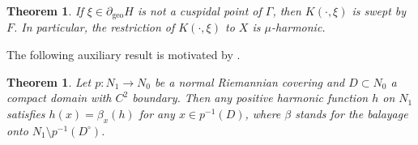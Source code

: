 \documentclass[12pt,a4paper]{amsart}
\numberwithin{equation}{section}
\newtheorem{thm}[equation]{Theorem}
\theoremstyle{definition}
\DeclareMathOperator{\geo}{geo}
\begin{document}
\begin{thm}\label{yesharm}
If $\xi \in \partial_{\geo} H$ is not a cuspidal point of $\Gamma$, then $K(\cdot,\xi)$ is swept by $F$. In particular, the restriction of $K(\cdot,\xi)$ to $X$ is $\mu$-harmonic.
\end{thm}

The following auxiliary result is motivated by \cite[Theorem 3.1]{BPe}.

\begin{thm}\label{sweep preim comp}
Let $p \colon N_1 \to N_0$ be a normal Riemannian covering and $D \subset N_0$ a compact domain with $C^2$ boundary. Then any positive harmonic function $h$ on $N_1$ satisfies $h(x) = \beta_x(h)$ for any $x \in p^{-1}(D)$, where $\beta$ stands for the balayage onto $N_1 \setminus p^{-1}(D^\circ)$.
\end{thm}
\end{document}
